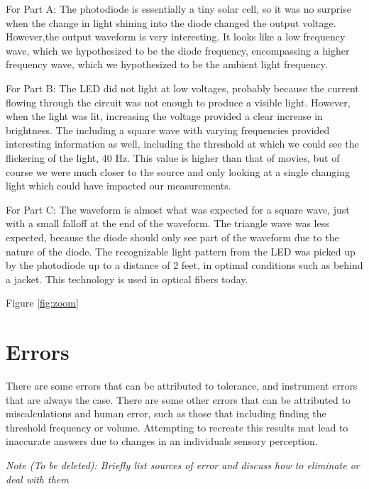 \documentclass[10pt]{article}
\begin{document}
For Part A: The photodiode is essentially a tiny solar cell, so it was no surprise when the change in light shining into the diode changed the output voltage. However,the output waveform is very interesting. It looks like a low frequency wave, which we hypothesized to be the diode frequency, encompassing a higher frequency wave, which we hypothesized to be the ambient light frequency.

For Part B: The LED did not light at low voltages, probably because the current flowing through the circuit was not enough to produce a visible light. However, when the light was lit, increasing the voltage provided a clear increase in brightness. The including a square wave with varying frequencies provided interesting information as well, including the threshold at which we could see the flickering of the light, 40 Hz. This value is higher than that of movies, but of course we were much closer to the source and only looking at a single changing light which could have impacted our measurements. 

For Part C: The waveform is almost what was expected for a square wave, just with a small falloff at the end of the waveform. The triangle wave was less expected, because the diode should only see part of the waveform due to the nature of the diode. The recognizable light pattern from the LED was picked up by the photodiode up to a distance of 2 feet, in optimal conditions such as behind a jacket. This technology is used in optical fibers today.

\medskip

Figure \ref{fig:zoom}
\section{Errors}

There are some errors that can be attributed to tolerance, and instrument errors that are always the case. There are some other errors that can be attributed to miscalculations and human error, such as those that including finding the threshold frequency or volume. Attempting to recreate this results mat lead to inaccurate answers due to changes in an individuals sensory perception.

\medskip

\textit{Note (To be deleted): Briefly list sources of error and discuss how to eliminate or deal with them}
\end{document}
